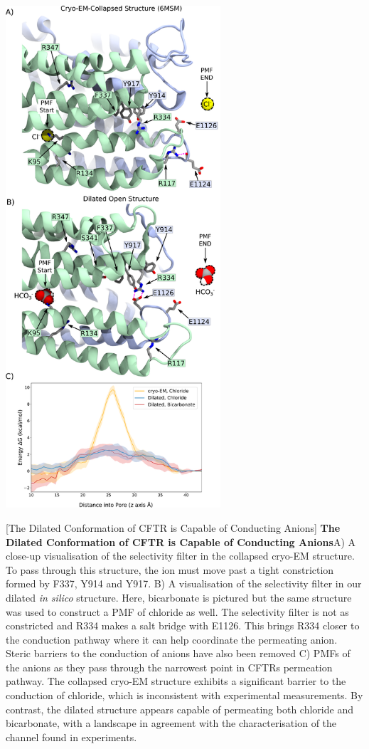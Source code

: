	\begin{center}
		\includegraphics[width=0.6\textwidth]{figures/opening/pmf_fig_1_combined.pdf}
	\end{center}
\begingroup

	\captionsetup{singlelinecheck = false, justification=raggedright}
	[The Dilated Conformation of CFTR is Capable of Conducting Anions] {\textbf{The Dilated Conformation of CFTR is Capable of Conducting Anions}}{A) A close-up visualisation of the selectivity filter in the collapsed cryo-EM structure. To pass through this structure, the ion must move past a tight constriction formed by F337, Y914 and Y917. B) A visualisation of the selectivity filter in our dilated \textit{in silico} structure. Here, bicarbonate is pictured but the same structure was used to construct a PMF of chloride as well. The selectivity filter is not as constricted and R334 makes a salt bridge with E1126. This brings R334 closer to the conduction pathway where it can help coordinate the permeating anion. Steric barriers to the conduction of anions have also been removed C) PMFs of the anions as they pass through the narrowest point in CFTRs permeation pathway. The collapsed cryo-EM structure exhibits a significant barrier to the conduction of chloride, which is inconsistent with experimental measurements. By contrast, the dilated structure appears capable of permeating both chloride and bicarbonate, with a landscape in agreement with the characterisation of the channel found in experiments. }
	\label{US_anions}
	\endgroup



